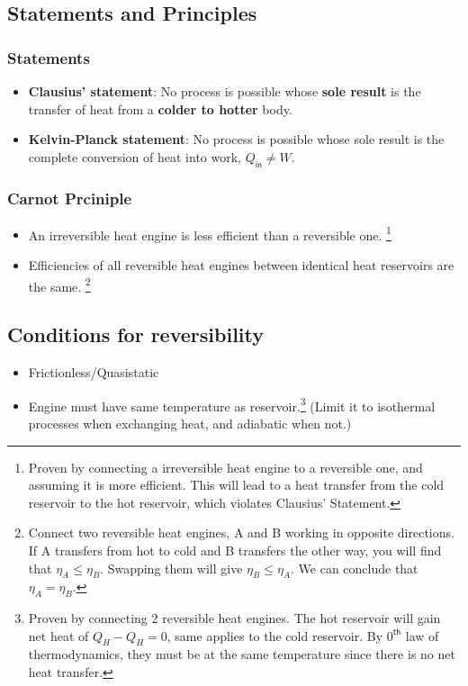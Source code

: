 \subsection{Statements and Principles}
\subsubsection{Statements}
\begin{itemize}
    \item \textbf{Clausius' statement}: No process is possible whose \textbf{sole result} is the transfer of heat from a \textbf{colder to hotter} body. 
    \item \textbf{Kelvin-Planck statement}: No process is possible whose sole result is the complete conversion of heat into work, $Q_{\textsf{in}}\neq W$.
\end{itemize}

\subsubsection{Carnot Prciniple}
\begin{itemize}
    \item An irreversible heat engine is less efficient than a reversible one. \footnote{Proven by connecting a irreversible heat engine to a reversible one, and assuming it is more efficient. This will lead to a heat transfer from the cold reservoir to the hot reservoir, which violates Clausius' Statement.}
    \item Efficiencies of all reversible heat engines between identical heat reservoirs are the same. \footnote{Connect two reversible heat engines, A and B working in opposite directions. If A transfers from hot to cold and B transfers the other way, you will find that $\eta_A \leq \eta_B$. Swapping them will give $\eta_B \leq \eta_A$. We can conclude that $\eta_A=\eta_B$.}
\end{itemize}

\subsection{Conditions for reversibility}
\begin{itemize}
    \item Frictionless/Quasistatic
    \item Engine must have same temperature as reservoir.\footnote{Proven by connecting 2 reversible heat engines. The hot reservoir will gain net heat of $Q_H-Q_H=0$, same applies to the cold reservoir. By $0^{\textsf{th}}$ law of thermodynamics, they must be at the same temperature since there is no net heat transfer.} (Limit it to isothermal processes when exchanging heat, and adiabatic when not.)
\end{itemize}

